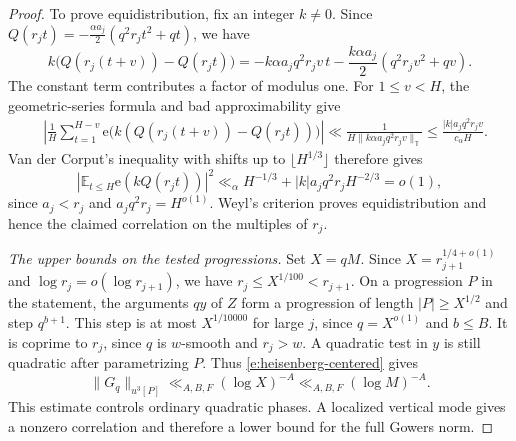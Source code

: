 \documentclass[12pt]{amsart}
\newcommand{\1}{\mathbf 1}
\newcommand{\e}{\mathrm e}
\theoremstyle{definition}
\begin{document}
\begin{proof}
To prove equidistribution, fix an integer \(k\ne0\). Since
\(Q(r_jt)=-\frac{\alpha a_j}{2}(q^2r_jt^2+qt)\), we have
\[
 k\bigl(Q(r_j(t+v))-Q(r_jt)\bigr)
 =-k\alpha a_jq^2r_jv\,t
  -\frac{k\alpha a_j}{2}(q^2r_jv^2+qv).
\]
The constant term contributes a factor of modulus one. For
\(1\leq v<H\), the geometric-series formula and bad approximability
give
\[
\begin{aligned}
 &\left|\frac1H\sum_{t=1}^{H-v}
    \e\bigl(k(Q(r_j(t+v))-Q(r_jt))\bigr)\right|\ll
 \frac{1}{H\|k\alpha a_jq^2r_jv\|_{\mathbb T}}
 \leq \frac{|k|a_jq^2r_jv}{c_\alpha H}.
\end{aligned}
\]
Van der Corput's inequality with shifts up to
\(\lfloor H^{1/3}\rfloor\) therefore gives
\[
 \left|\mathbb E_{t\leq H}\e(kQ(r_jt))\right|^2
 \ll_\alpha H^{-1/3}+|k|a_jq^2r_jH^{-2/3}=o(1),
\]
since \(a_j<r_j\) and \(a_jq^2r_j=H^{o(1)}\).
Weyl's criterion proves equidistribution and hence the claimed
correlation on the multiples of \(r_j\).



\medskip
\noindent\emph{The upper bounds on the tested progressions.}
Set \(X=qM\). Since \(X=r_{j+1}^{1/4+o(1)}\) and
\(\log r_j=o(\log r_{j+1})\), we have
\(r_j\leq X^{1/100}<r_{j+1}\). On a progression \(P\) in the
statement, the arguments \(qy\) of \(Z\) form a progression
of length \(|P|\geq X^{1/2}\) and step \(q^{b+1}\).
This step is at most \(X^{1/10000}\) for large \(j\), since
\(q=X^{o(1)}\) and \(b\leq B\). It is coprime to \(r_j\),
since \(q\) is \(w\)-smooth and \(r_j>w\). A quadratic test
in \(y\) is still quadratic after parametrizing \(P\).
Thus \eqref{e:heisenberg-centered} gives
\[
 \|G_q\|_{u^3[P]}\ll_{A,B,F}(\log X)^{-A}
 \ll_{A,B,F}(\log M)^{-A}.
\]
This estimate controls ordinary quadratic phases.
A localized vertical mode gives a nonzero correlation and
therefore a lower bound for the full Gowers norm.

\medskip


\end{proof}
\end{document}

